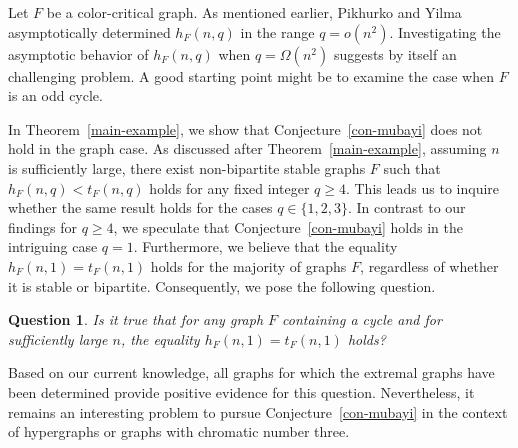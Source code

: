 \documentclass[10pt]{article}
\newtheorem{question}[theorem]{Question}
\begin{document}
Let $F$ be a color-critical graph. As mentioned earlier, Pikhurko and Yilma \cite{pikhurko2017} asymptotically determined $h_F(n,q)$ in the range $q=o(n^2)$. Investigating the asymptotic behavior of $h_F(n,q)$ when $q=\Omega(n^2)$ suggests by itself an challenging problem.
A good starting point might be to examine the case when $F$ is an odd cycle.


In Theorem~\ref{main-example}, we show that Conjecture~\ref{con-mubayi} does not hold in the graph case.
As discussed after Theorem~\ref{main-example},
assuming $n$ is sufficiently large, there exist non-bipartite stable graphs $F$ such that $h_F(n,q)<t_F(n,q)$ holds for any fixed integer $q\geq 4$.
This leads us to inquire whether the same result holds for the cases $q\in \{1,2,3\}$.
In contrast to our findings for $q\geq 4$, we speculate that Conjecture~\ref{con-mubayi} holds in the intriguing case $q=1$.
Furthermore, we believe that the equality $h_F(n,1)=t_F(n,1)$ holds for the majority of graphs $F$, regardless of whether it is stable or bipartite.
Consequently, we pose the following question.
\begin{question}
Is it true that for any graph $F$ containing a cycle and for sufficiently large $n$, the equality $h_F(n,1)=t_F(n,1)$ holds?
\end{question}

Based on our current knowledge, all graphs for which the extremal graphs have been determined provide positive evidence for this question.
Nevertheless, it remains an interesting problem to pursue Conjecture~\ref{con-mubayi}
in the context of hypergraphs or graphs with chromatic number three.
\end{document}
